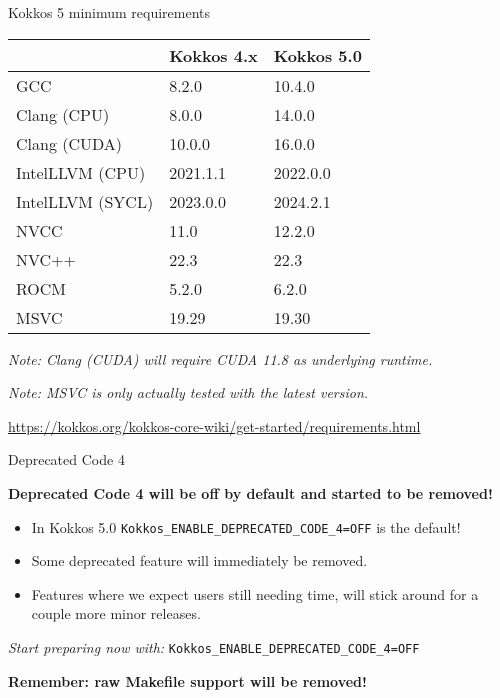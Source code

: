 \begin{frame}[fragile]{Kokkos 5 minimum requirements}

\begin{table}[]
\begin{tabular}{lll}
\multicolumn{1}{r}{} & Kokkos 4.x & Kokkos 5.0 \\ \hline
GCC                  & 8.2.0      & 10.4.0     \\
Clang (CPU)          & 8.0.0      & 14.0.0     \\
Clang (CUDA)         & 10.0.0     & 16.0.0     \\
IntelLLVM (CPU)      & 2021.1.1   & 2022.0.0   \\
IntelLLVM (SYCL)     & 2023.0.0   & 2024.2.1   \\
NVCC                 & 11.0       & 12.2.0     \\
NVC++                & 22.3       & 22.3       \\
ROCM                 & 5.2.0      & 6.2.0      \\
MSVC                 & 19.29      & 19.30      \\
\end{tabular}
\end{table}

\textit{\footnotesize Note: Clang (CUDA) will require CUDA 11.8 as underlying runtime.}

\textit{\footnotesize Note: MSVC is only actually tested with the latest version.}

\begin{center}
\url{https://kokkos.org/kokkos-core-wiki/get-started/requirements.html}
\end{center}
\end{frame}


\begin{frame}[fragile]{Deprecated Code 4}

\textbf{Deprecated Code 4 will be off by default and started to be removed!}

\begin{itemize}
\item In Kokkos 5.0 \texttt{Kokkos\_ENABLE\_DEPRECATED\_CODE\_4=OFF} is the default!
\item Some deprecated feature will immediately be removed.
\item Features where we expect users still needing time, will stick around for a couple more minor releases. 
\end{itemize}

\begin{center}
\textit{Start preparing now with:} \texttt{Kokkos\_ENABLE\_DEPRECATED\_CODE\_4=OFF}

\vspace{1cm}
\textbf{Remember: raw Makefile support will be removed!}
\end{center}
\end{frame}

